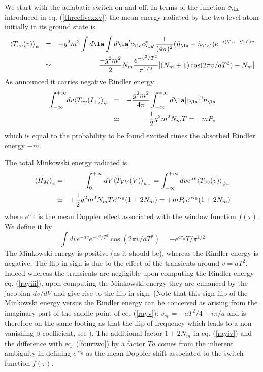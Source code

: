 We start with the adiabatic switch on and off.
In terms of the function
 $c_\la$ introduced in eq. (\ref{threefivexxv}) the mean energy
radiated by the two
level atom
initially in its ground state is
\begin{eqnarray}
\bk{T_{vv}(v)}_{\psi_-}  &=& -
g^2m^2\int d\la \int d\la^\prime c_\la c^*_{\la^\prime}
{1 \over (4 \pi)^2} (\tilde n_\la + \tilde n_{\la^\prime})
e^{-i(\la-\la^\prime)v}
\nonumber\\
&\simeq&{-
{g^2 m^2} \over 2  }
N_m  { e^{-v^2/T^2} \over\pi^{1/2}}
[ (N_m + 1) \cos (2 \pi v/aT^2) - N_m]
\label{rayii}
\end{eqnarray}
As announced it carries negative
Rindler energy:
 \begin{eqnarray}
\int^{+\infty}_{-\infty} \!dv \bk{T_{vv}(I_+)}_{\psi_-} &=& -  {g^2
m^2 \over 4 \pi} \int^{+\infty}_{-\infty}
d\la
\vert c_\la \vert^2  \tilde n_\la
 \nonumber\\  &\simeq&
-{1 \over 2}g^2 m^2 N_mT= -m P_{e}
\label{rayiii}
\end{eqnarray}
which is equal to the probability to be found excited times the absorbed
Rindler energy
$-m$.

The total Minkowski energy radiated is
\begin{eqnarray} \mbox{$ \langle H_M \rangle $}_e &=& \int^{+\infty}_0
dV \mbox{$ \langle T_{VV}(V) \rangle $}_{\psi_-} =
 \int^{+\infty}_{-\infty}  dv  e^{av} \mbox{$ \langle T_{vv}(v) \rangle $}_{\psi_-}\nonumber\\
&\simeq& +{1 \over
2} g^2 m^2   N_m T e^{a \tau_0}(1 + 2 N_m)= +m P_{e} e^{a \tau_0}
(1 + 2 N_m)
\label{rayiv}
\end{eqnarray}
where $ e^{a \tau_0}$ is the mean Doppler
effect associated with the window
function $f(\tau)$. We define it by
\begin{equation}
\int\! dv e^{-av} e^{-v^2/T^2} \cos(2 \pi v/aT^2) = - e^{a \tau_0} T/\pi^{1/2}
\label{rayv}\end{equation}
The Minkowski energy is positive (as it should be), whereas the Rindler
energy
is negative. The flip in sign is due to the effect of the transients
around $v = aT^2$.
Indeed whereas
the transients
 are negligible upon computing the Rindler energy eq. (\ref{rayiii}),
upon computing
the Minkowski energy they are enhanced by the jacobian $dv/dV$ and give
rise to the flip in sign.
(Note that this sign flip of the Minkowski energy versus the
Rindler energy can be conceived as arising from the imaginary part of
the saddle point
of eq. (\ref{rayv}): $v_{sp} = -a T^2/4 + i \pi /a$ and is therefore on the
same footing as  that the flip of frequency which leads
to a non vanishing $\beta$ coefficient, see \cite{pbt}). The additional
factor $1+ 2N_m $ in eq. (\ref{rayiv}) and the difference with
eq. (\ref{fourtwo})
by a factor $Ta$
 comes from
the inherent ambiguity in defining $e^{a \tau_0}$ as the mean
Doppler shift associated to the  switch  function $f(\tau)$.

